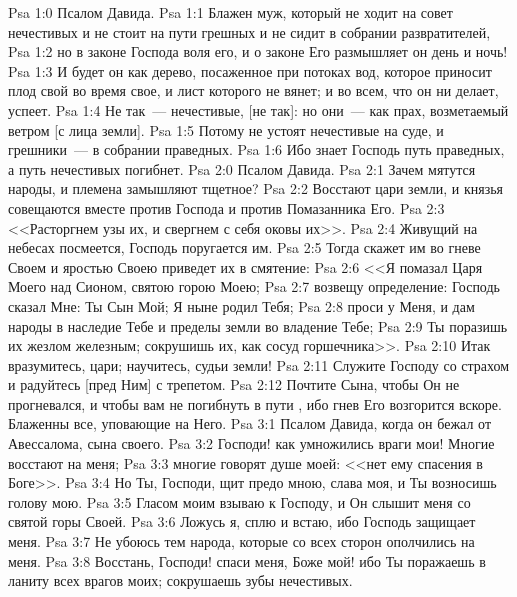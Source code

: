 \vs Psa 1:0 Псалом Давида.
\rsbpar\vs Psa 1:1 Блажен муж, который не ходит на совет нечестивых и не стоит на пути грешных и не сидит в собрании развратителей,
\vs Psa 1:2 но в законе Господа воля его, и о законе Его размышляет он день и ночь!
\vs Psa 1:3 И будет он как дерево, посаженное при потоках вод, которое приносит плод свой во время свое, и лист которого не вянет; и во всем, что он ни делает, успеет.
\vs Psa 1:4 Не так~--- нечестивые, [не так]: но они~--- как прах, возметаемый ветром [с лица земли].
\vs Psa 1:5 Потому не устоят нечестивые на суде, и грешники~--- в собрании праведных.
\vs Psa 1:6 Ибо знает Господь путь праведных, а путь нечестивых погибнет.
\vs Psa 2:0 Псалом Давида.
\rsbpar\vs Psa 2:1 Зачем мятутся народы, и племена замышляют тщетное?
\vs Psa 2:2 Восстают цари земли, и князья совещаются вместе против Господа и против Помазанника Его.
\vs Psa 2:3 <<Расторгнем узы их, и свергнем с себя оковы их>>.
\vs Psa 2:4 Живущий на небесах посмеется, Господь поругается им.
\vs Psa 2:5 Тогда скажет им во гневе Своем и яростью Своею приведет их в смятение:
\vs Psa 2:6 <<Я помазал Царя Моего над Сионом, святою горою Моею;
\vs Psa 2:7 возвещу определение: Господь сказал Мне: Ты Сын Мой; Я ныне родил Тебя;
\vs Psa 2:8 проси у Меня, и дам народы в наследие Тебе и пределы земли во владение Тебе;
\vs Psa 2:9 Ты поразишь их жезлом железным; сокрушишь их, как сосуд горшечника>>.
\vs Psa 2:10 Итак вразумитесь, цари; научитесь, судьи земли!
\vs Psa 2:11 Служите Господу со страхом и радуйтесь [пред Ним] с трепетом.
\vs Psa 2:12 Почтите Сына, чтобы Он не прогневался, и чтобы вам не погибнуть в пути , ибо гнев Его возгорится вскоре. Блаженны все, уповающие на Него.
\vs Psa 3:1 Псалом Давида, когда он бежал от Авессалома, сына своего.
\rsbpar\vs Psa 3:2 Господи! как умножились враги мои! Многие восстают на меня;
\vs Psa 3:3 многие говорят душе моей: <<нет ему спасения в Боге>>.
\vs Psa 3:4 Но Ты, Господи, щит предо мною, слава моя, и Ты возносишь голову мою.
\vs Psa 3:5 Гласом моим взываю к Господу, и Он слышит меня со святой горы Своей.
\vs Psa 3:6 Ложусь я, сплю и встаю, ибо Господь защищает меня.
\vs Psa 3:7 Не убоюсь тем народа, которые со всех сторон ополчились на меня.
\vs Psa 3:8 Восстань, Господи! спаси меня, Боже мой! ибо Ты поражаешь в ланиту всех врагов моих; сокрушаешь зубы нечестивых.
